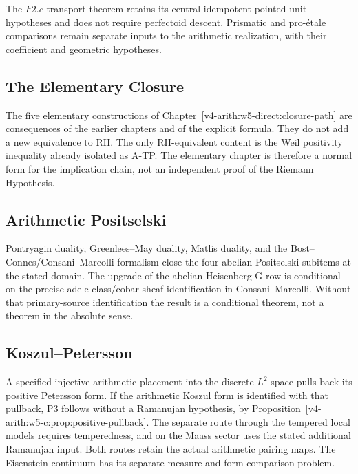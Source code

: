 The $F2.c$ transport theorem retains its central idempotent pointed-unit
hypotheses and does not require perfectoid descent. Prismatic and
pro-\'{e}tale comparisons remain separate inputs to the arithmetic
realization, with their coefficient and geometric hypotheses.

\subsection{The Elementary Closure}
\label{v4-arith:w6-j:ch53}

The five elementary constructions of Chapter~\ref{v4-arith:w5-direct:closure-path}
are consequences of the earlier chapters and of the explicit formula.
They do not add a new equivalence to RH.  The only RH-equivalent
content is the Weil positivity inequality already isolated as
A-TP.  The elementary chapter is therefore a normal form for the
implication chain, not an independent proof of the Riemann Hypothesis.

\subsection{Arithmetic Positselski}
\label{v4-arith:w6-j:ch54}

Pontryagin duality, Greenlees--May duality, Matlis duality, and the
Bost--Connes/Consani--Marcolli formalism close the four abelian
Positselski subitems at the stated domain.  The upgrade of the abelian
Heisenberg G-row is conditional on the precise adele-class/cobar-sheaf
identification in Consani--Marcolli.  Without that primary-source
identification the result is a conditional theorem, not a theorem in
the absolute sense.

\subsection{Koszul--Petersson}
\label{v4-arith:w6-j:ch55}

A specified injective arithmetic placement into the discrete
\(L^2\) space pulls back its positive Petersson form. If the
arithmetic Koszul form is identified with that pullback, P3 follows
without a Ramanujan hypothesis, by
Proposition~\ref{v4-arith:w5-c:prop:positive-pullback}.
The separate route through the tempered local models requires
temperedness, and on the Maass sector uses the stated additional
Ramanujan input. Both routes retain the actual arithmetic pairing
maps. The Eisenstein continuum has its separate measure and
form-comparison problem.


